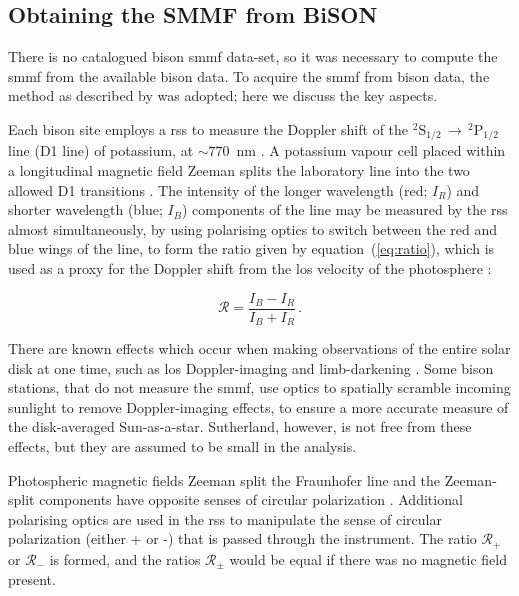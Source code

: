 \subsection{Obtaining the SMMF from BiSON}

There is no catalogued \gls{bison} \gls{smmf} data-set, so it was necessary to compute the \gls{smmf} from the available \gls{bison} data. To acquire the \gls{smmf} from \gls{bison} data, the method as described by \citet{chaplin_studies_2003} was adopted; here we discuss the key aspects.

Each \gls{bison} site employs a \gls{rss} to measure the Doppler shift of the $^{2}\mathrm{S}_{1/2} \, \rightarrow \, ^{2}\mathrm{P}_{1/2}$ line (D1 line) of potassium, at $\sim 770$~nm \citep{brookes_resonant-scattering_1978}. A potassium vapour cell placed within a longitudinal magnetic field Zeeman splits the laboratory line into the two allowed D1 transitions \citep{lund_spatial_2017}. The intensity of the longer wavelength (red; $I_R$) and shorter wavelength (blue; $I_B$) components of the line may be measured by the \gls{rss} almost simultaneously, by using polarising optics to switch between the red and blue wings of the line, to form the ratio given by equation~(\ref{eq:ratio}), which is used as a proxy for the Doppler shift from the \gls{los} velocity of the photosphere \citep[see:][]{brookes_observation_1976, brookes_resonant-scattering_1978, elsworth_performance_1995, chaplin_studies_2003, lund_spatial_2017}: 

\begin{equation}
\mathcal{R} = \frac{I_B - I_R}{I_B + I_R} \, .
\label{eq:ratio}
\end{equation}

There are known effects which occur when making observations of the entire solar disk at one time, such as \gls{los} Doppler-imaging and limb-darkening \citep{davies_bison_2014}. Some \gls{bison} stations, that do not measure the \gls{smmf}, use optics to spatially scramble incoming sunlight to remove Doppler-imaging effects, to ensure a more accurate measure of the disk-averaged Sun-as-a-star. Sutherland, however, is not free from these effects, but they are assumed to be small in the analysis.

Photospheric magnetic fields Zeeman split the Fraunhofer line and the Zeeman-split components have opposite senses of circular polarization \citep{chaplin_studies_2003}. Additional polarising optics are used in the \gls{rss} to manipulate the sense of circular polarization (either + or -) that is passed through the instrument. The ratio $\mathcal{R}_{+}$ or $\mathcal{R}_{-}$ is formed, and the ratios $\mathcal{R}_{\pm}$ would be equal if there was no magnetic field present.

